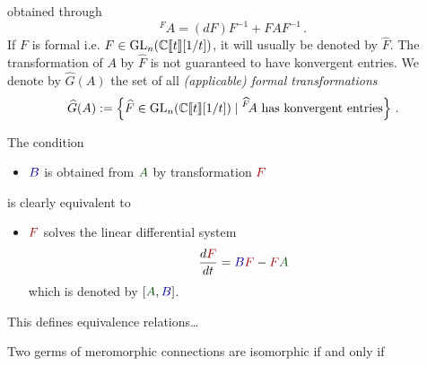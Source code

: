 obtained through
\[
  {}^F\!A=(dF)F^{-1} + FAF^{-1} \,.
\]
If $F$ is formal i.e. $F\in\operatorname{GL}_n(\mathbb{C}\llbracket t\rrbracket[1/t])$, it will
usually be denoted by $\hat F$. The transformation of $A$ by $\hat F$ is not
guaranteed to have konvergent entries.
We denote by $\hat G(A)$ the set of all \emph{(applicable) formal
transformations}
\[
  \widehat G(A):=\left\{\widehat F\in\operatorname{GL}_n(\mathbb{C}\llbracket t\rrbracket[1/t])
    \mid {}^{\widehat F}\!A \text{ has konvergent entries}
  \right\}\,.
\]
\begin{rem}
  \def\myB{\textcolor{blue!60!black}{B}}
  \def\myA{\textcolor{green!30!black}{A}}
  \def\myF{\textcolor{red!60!black}{F}}
  The condition
  \begin{itemize}
    \item[] $\myB$ is obtained from $\myA$ by transformation $\myF$
  \end{itemize}
  is clearly equivalent to
  \begin{itemize}
    \item[]  $\myF$ solves the linear differential system
      \[
        \frac{d\myF}{dt}=\myB\myF-\myF\myA
      \]
      which is denoted by $[\myA,\myB]$.
  \end{itemize}
\end{rem}

This defines equivalence relations\dots \TODO

\begin{defn}
  Two germs of meromorphic connections are isomorphic if and only if \TODO
\end{defn}

